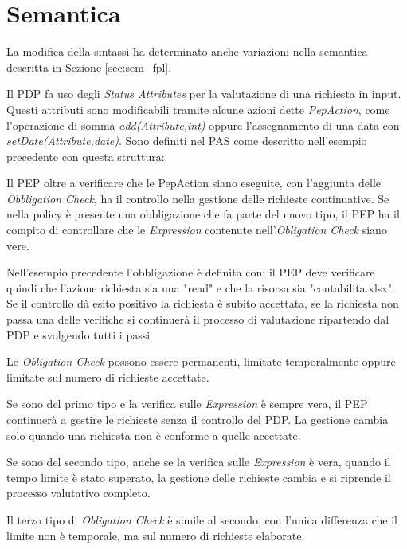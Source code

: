 \section{Semantica}
\label{sub:SemanticaNew}
La modifica della sintassi ha determinato anche variazioni nella semantica descritta in Sezione \ref{sec:sem_fpl}.\par
Il \ac{PDP} fa uso degli \emph{Status Attributes} per la valutazione di una richiesta in input.
Questi attributi sono modificabili tramite alcune azioni dette \emph{PepAction}, come l'operazione di somma \emph{add(Attribute,int)}
oppure l'assegnamento di una data con \emph{setDate(Attribute,date)}.
Sono definiti nel \ac{PAS} come descritto nell'esempio precedente con questa struttura:
\label{lst:esempio_sintassiPAS2}
\par Il \ac{PEP} oltre a verificare che le PepAction siano eseguite, con l'aggiunta delle \emph{Obbligation Check}, ha il
controllo nella gestione delle richieste continuative. Se nella policy è presente una obbligazione che fa parte del nuovo tipo,
il \ac{PEP} ha il compito di controllare che le \emph{Expression} contenute nell'\emph{Obligation Check} siano vere.\par
Nell'esempio precedente l'obbligazione è definita con:
\label{lst:esempio_sintassiObl}
il \ac{PEP} deve verificare quindi che l'azione richiesta sia una "read" e che la risorsa sia "contabilita.xlsx".
Se il controllo dà esito positivo la richiesta è subito accettata, se la richiesta non passa una delle verifiche si continuerà
il processo di valutazione ripartendo dal \ac{PDP} e svolgendo tutti i passi.\par
Le \emph{Obligation Check} possono essere permanenti, limitate temporalmente oppure limitate sul numero di richieste
accettate.\par
\begin{description}[labelindent=5pt,style=multiline,leftmargin=3.5cm]
  \item[Permanenti]Se sono del primo tipo e la verifica sulle \emph{Expression} è sempre vera, il \ac{PEP} continuerà a gestire le
  richieste senza il controllo del \ac{PDP}. La gestione cambia solo quando una richiesta non è conforme a quelle accettate.\par
  \item[Scadenza sul tempo]Se sono del secondo tipo, anche se la verifica sulle \emph{Expression} è vera, quando il tempo limite è stato superato,
  la gestione delle richieste cambia e si riprende il processo valutativo completo.
  \item[Scadenza sul numero di richieste]Il terzo tipo di \emph{Obligation Check} è simile al secondo, con l'unica differenza che il limite non è temporale,
  ma sul numero di richieste elaborate.
\end{description}

